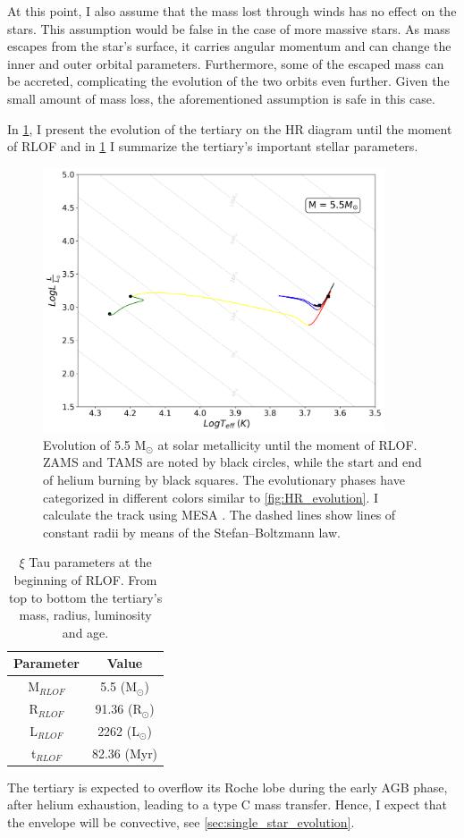 At this point, I also assume that the mass lost through winds has no effect on the stars. This assumption would be false in the case of more massive stars. As mass escapes from the star's surface, it carries angular momentum and can change the inner and outer orbital parameters. Furthermore, some of the escaped mass can be accreted, complicating the evolution of the two orbits even further. Given the small amount of mass loss, the aforementioned assumption is safe in this case.

In \cref{fig:HR_ROLF}, I present the evolution of the tertiary on the HR diagram until the moment of RLOF and in \cref{tab:tertiary_param_ROLF} I summarize the tertiary's important stellar parameters. 
\begin{figure}[H]
    \centering
    \includegraphics[width=0.9\textwidth]{Thesis/graphs/HR_1-1ROLF.pdf}
    \caption{Evolution of 5.5 M$_{\odot}$ at solar metallicity until the moment of RLOF. ZAMS and TAMS are noted by black circles, while the start and end of helium burning by black squares. The evolutionary phases have categorized in different colors similar to \cref{fig:HR_evolution}. I calculate the track using MESA \citep{paxton2010modules,paxton2013modules,paxton2015modules,paxton2019modules}. The dashed lines show lines of constant radii by means of the Stefan–Boltzmann law.}
    \label{fig:HR_ROLF}
\end{figure}
\begin{table}[H]
    \centering
    \begin{tabular}{| c | c |}
       Parameter & Value \\
       \hline 
       M$_{RLOF}$ & 5.5 (M$_{\odot}$) \\
       R$_{RLOF}$ & 91.36 (R$_{\odot}$) \\
       L$_{RLOF}$ & 2262 (L$_{\odot}$) \\
       t$_{RLOF}$ & 82.36 (Myr) 
    \end{tabular}
    \caption{ $\xi$ Tau parameters at the beginning of RLOF. From top to bottom the tertiary's mass, radius, luminosity and age.}
    \label{tab:tertiary_param_ROLF}
\end{table}
The tertiary is expected to overflow its Roche lobe during the early AGB phase, after helium exhaustion, leading to a type C mass transfer. Hence, I expect that the envelope will be convective, see \cref{sec:single_star_evolution}.

